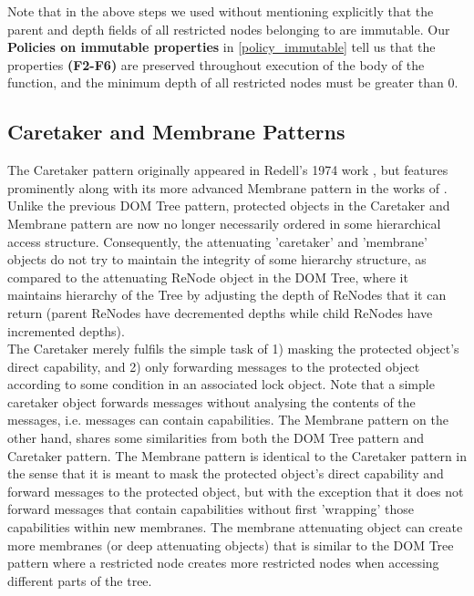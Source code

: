 \documentclass[a4paper,11pt,twoside]{article}
\begin{document}
Note that in the above steps we used without mentioning explicitly that the parent and depth fields of all restricted nodes belonging to  are immutable. Our \textbf{Policies on immutable properties} in \cref{policy_immutable} tell us that the properties \textbf{(F2-F6)} are preserved throughout execution of the body of the  function, and the minimum depth of all restricted nodes must be greater than 0.
\clearpage
\subsection{Caretaker and Membrane Patterns}

The Caretaker pattern originally appeared in Redell's 1974 work {\cite{redell1974}, but features prominently along with its more advanced Membrane pattern in the works of \cite{miller2006,murray2010,swasey2017}. Unlike the previous DOM Tree pattern, protected objects in the Caretaker and Membrane pattern are now no longer necessarily ordered in some hierarchical access structure. Consequently, the attenuating 'caretaker' and 'membrane' objects do not try to maintain the integrity of some hierarchy structure, as compared to the attenuating ReNode object in the DOM Tree, where it maintains hierarchy of the Tree by adjusting the depth of ReNodes that it can return (parent ReNodes have decremented depths while child ReNodes have incremented depths).\\

The Caretaker merely fulfils the simple task of 1) masking the protected object's direct capability, and 2) only forwarding messages to the protected object according to some condition in an associated lock object. Note that a simple caretaker object forwards messages without analysing the contents of the messages, i.e. messages can contain capabilities. The Membrane pattern on the other hand, shares some similarities from both the DOM Tree pattern and Caretaker pattern. The Membrane pattern is identical to the Caretaker pattern in the sense that it is meant to mask the protected object's direct capability and forward messages to the protected object, but with the exception that it does not forward messages that contain capabilities without first 'wrapping' those capabilities within new membranes. The membrane attenuating object can create more membranes (or deep attenuating objects) that is similar to the DOM Tree pattern where a restricted node creates more restricted nodes when accessing different parts of the tree.\\

}
\end{document}
